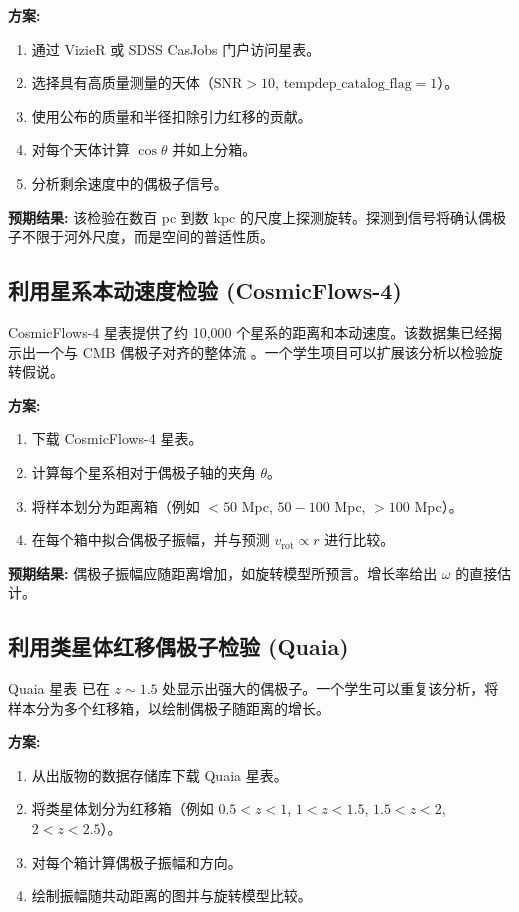\documentclass[11pt,a4paper]{article}
\begin{document}
	\textbf{方案:}
	\begin{enumerate}
		\item 通过 VizieR 或 SDSS CasJobs 门户访问星表。
		\item 选择具有高质量测量的天体（\(\mathrm{SNR} > 10\), \(\mathrm{tempdep\_catalog\_flag} = 1\)）。
		\item 使用公布的质量和半径扣除引力红移的贡献。
		\item 对每个天体计算 \(\cos\theta\) 并如上分箱。
		\item 分析剩余速度中的偶极子信号。
	\end{enumerate}
	
	\textbf{预期结果:} 该检验在数百 pc 到数 kpc 的尺度上探测旋转。探测到信号将确认偶极子不限于河外尺度，而是空间的普适性质。
	
	\subsection{利用星系本动速度检验 (CosmicFlows-4)}
	
	CosmicFlows-4 星表提供了约 10,000 个星系的距离和本动速度。该数据集已经揭示出一个与 CMB 偶极子对齐的整体流 \cite{Watkins2023}。一个学生项目可以扩展该分析以检验旋转假说。
	
	\textbf{方案:}
	\begin{enumerate}
		\item 下载 CosmicFlows-4 星表。
		\item 计算每个星系相对于偶极子轴的夹角 \(\theta\)。
		\item 将样本划分为距离箱（例如 \(<50\) Mpc, \(50-100\) Mpc, \(>100\) Mpc）。
		\item 在每个箱中拟合偶极子振幅，并与预测 \(v_{\mathrm{rot}} \propto r\) 进行比较。
	\end{enumerate}
	
	\textbf{预期结果:} 偶极子振幅应随距离增加，如旋转模型所预言。增长率给出 \(\omega\) 的直接估计。
	
	\subsection{利用类星体红移偶极子检验 (Quaia)}
	
	Quaia 星表 \cite{Secrest2025} 已在 \(z\sim1.5\) 处显示出强大的偶极子。一个学生可以重复该分析，将样本分为多个红移箱，以绘制偶极子随距离的增长。
	
	\textbf{方案:}
	\begin{enumerate}
		\item 从出版物的数据存储库下载 Quaia 星表。
		\item 将类星体划分为红移箱（例如 \(0.5<z<1\), \(1<z<1.5\), \(1.5<z<2\), \(2<z<2.5\)）。
		\item 对每个箱计算偶极子振幅和方向。
		\item 绘制振幅随共动距离的图并与旋转模型比较。
	\end{enumerate}
	
\end{document}
